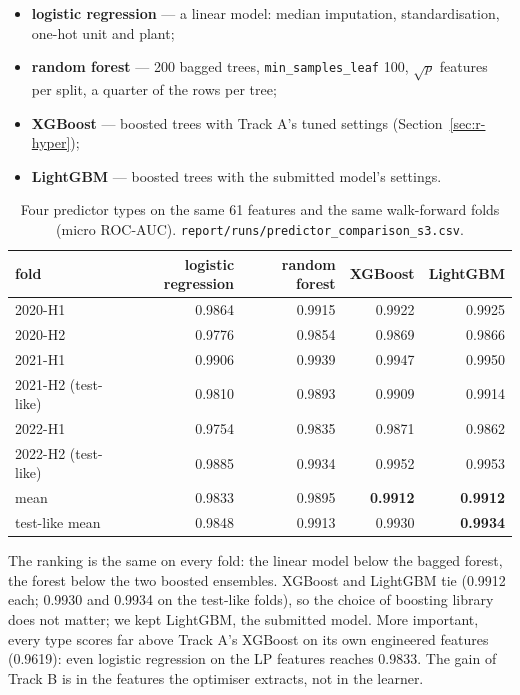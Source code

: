 \documentclass[11pt]{article}
\begin{document}
\begin{itemize}
\item \textbf{logistic regression} --- a linear model: median imputation, standardisation, one-hot
  unit and plant;
\item \textbf{random forest} --- 200 bagged trees, \texttt{min\_samples\_leaf} 100, $\sqrt{p}$
  features per split, a quarter of the rows per tree;
\item \textbf{XGBoost} --- boosted trees with Track A's tuned settings (Section~\ref{sec:r-hyper});
\item \textbf{LightGBM} --- boosted trees with the submitted model's settings.
\end{itemize}

\begin{table}[H]
\centering\small
\begin{tabular}{lrrrr}
\toprule
fold & logistic regression & random forest & XGBoost & LightGBM \\
\midrule
2020-H1 & 0.9864 & 0.9915 & 0.9922 & 0.9925 \\
2020-H2 & 0.9776 & 0.9854 & 0.9869 & 0.9866 \\
2021-H1 & 0.9906 & 0.9939 & 0.9947 & 0.9950 \\
2021-H2 (test-like) & 0.9810 & 0.9893 & 0.9909 & 0.9914 \\
2022-H1 & 0.9754 & 0.9835 & 0.9871 & 0.9862 \\
2022-H2 (test-like) & 0.9885 & 0.9934 & 0.9952 & 0.9953 \\
\midrule
mean & 0.9833 & 0.9895 & \textbf{0.9912} & \textbf{0.9912} \\
test-like mean & 0.9848 & 0.9913 & 0.9930 & \textbf{0.9934} \\
\bottomrule
\end{tabular}
\caption{Four predictor types on the same 61 features and the same walk-forward folds (micro
ROC-AUC). \texttt{report/runs/predictor\_comparison\_s3.csv}.}
\label{tab:r-types}
\end{table}

The ranking is the same on every fold: the linear model below the bagged forest, the forest below
the two boosted ensembles. XGBoost and LightGBM tie (0.9912 each; 0.9930 and 0.9934 on the test-like
folds), so the choice of boosting library does not matter; we kept LightGBM, the submitted model.
More important, every type scores far above Track A's XGBoost on its own engineered features
(0.9619): even logistic regression on the LP features reaches 0.9833. The gain of Track B is in the
features the optimiser extracts, not in the learner.
\end{document}
